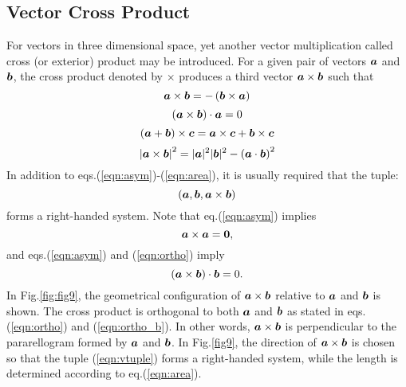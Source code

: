 \documentclass[10pt,a4j]{article}
\begin{document}
\subsection{Vector Cross Product} 
For vectors in three dimensional space, yet another vector multiplication called cross (or exterior) product may be introduced. For a given pair of vectors $\mbox{\boldmath $a$}$ and $\mbox{\boldmath $b$}$, 
the cross product denoted by $\times$ produces a third vector $\mbox{\boldmath $a$}\times \mbox{\boldmath $b$}$ such that 
\begin{equation}
    \mbox{\boldmath $a$}\times \mbox{\boldmath $b$}= -\left(\mbox{\boldmath $b$} \times \mbox{\boldmath $a$} \right)
    \label{eqn:asym}
\end{equation}
\begin{equation}
    \left(\mbox{\boldmath $a$}\times\mbox{\boldmath $b$}\right)\cdot\mbox{\boldmath $a$} = 0
    \label{eqn:ortho}
\end{equation}
\begin{equation}
    \left(\mbox{\boldmath $a$}+\mbox{\boldmath $b$}\right)\times \mbox{\boldmath $c$}
    =
    \mbox{\boldmath $a$}\times \mbox{\boldmath $c$}+ \mbox{\boldmath $b$}\times \mbox{\boldmath $c$}
    \label{eqn:dist_eprod}
\end{equation}
\begin{equation}
    \left|\mbox{\boldmath $a$}\times \mbox{\boldmath $b$} \right|^2=|\mbox{\boldmath $a$}|^2|\mbox{\boldmath $b$}|^2-\left(\mbox{\boldmath $a$}\cdot\mbox{\boldmath $b$}\right)^2
    \label{eqn:area}
\end{equation}
In addition to eqs.(\ref{eqn:asym})-(\ref{eqn:area}), it is usually 
required that the tuple:
\begin{equation}
    \left(\mbox{\boldmath $a$},\mbox{\boldmath $b$},\mbox{\boldmath $a$}\times \mbox{\boldmath $b$} \right)
    \label{eqn:vtuple}
\end{equation}
forms a right-handed system. Note that eq.(\ref{eqn:asym}) implies 
\begin{equation}
    \mbox{\boldmath $a$}\times \mbox{\boldmath $a$}=\mbox{\boldmath $0$}, 
    \label{eqn:}
\end{equation}
and eqs.(\ref{eqn:asym}) and (\ref{eqn:ortho}) imply 
\begin{equation}
    \left(\mbox{\boldmath $a$}\times\mbox{\boldmath $b$}\right)\cdot\mbox{\boldmath $b$} =0. 
    \label{eqn:ortho_b}
\end{equation}
In Fig.\ref{fig:fig9}, the geometrical configuration of $\mbox{\boldmath $a$}\times\mbox{\boldmath $b$}$ 
relative to $\mbox{\boldmath $a$}$ and $\mbox{\boldmath $b$}$ is shown. 
The cross product is orthogonal to both $\mbox{\boldmath $a$}$ and $\mbox{\boldmath $b$}$ as stated in eqs.(\ref{eqn:ortho}) 
and (\ref{eqn:ortho_b}). In other words, $\mbox{\boldmath $a$}\times \mbox{\boldmath $b$}$ is perpendicular to 
the pararellogram formed by $\mbox{\boldmath $a$}$ and $\mbox{\boldmath $b$}$. In Fig.\ref{fig9}, 
the direction of $\mbox{\boldmath $a$}\times\mbox{\boldmath $b$}$ is chosen so that the tuple (\ref{eqn:vtuple}) 
forms a right-handed system, while the length is determined according to eq.(\ref{eqn:area}). 
\end{document}
